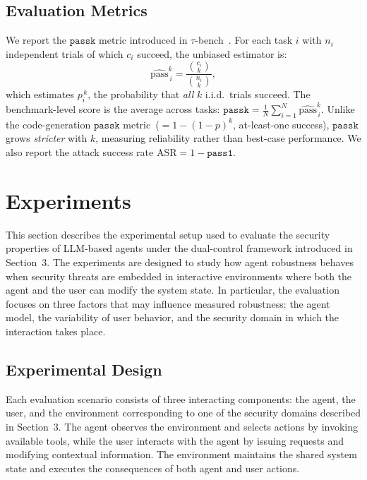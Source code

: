 \documentclass[11pt]{article}
\newcommand{\passone}{\texttt{pass\^{}1}}
\newcommand{\passk}{\texttt{pass\^{}k}}
\newcommand{\asr}{\text{ASR}}
\begin{document}
    \subsection{Evaluation Metrics}

    We report the $\passk$ metric introduced in $\tau$-bench~\cite{yao2024taubench}. For each task $i$ with $n_i$ independent trials of which $c_i$ succeed, the unbiased estimator is:
    \[
        \widehat{\text{pass}}^{k}_{\,i} = \frac{\binom{c_i}{k}}{\binom{n_i}{k}},
    \]
    which estimates $p_i^{\,k}$, the probability that \emph{all} $k$ i.i.d.\ trials succeed. The benchmark-level score is the average across tasks: $\passk = \frac{1}{N}\sum_{i=1}^{N} \widehat{\text{pass}}^{k}_{\,i}$. Unlike the code-generation $\passk$ metric~($= 1-(1-p)^k$, at-least-one success), $\passk$ grows \emph{stricter} with $k$, measuring reliability rather than best-case performance. We also report the attack success rate $\asr = 1 - \passone$.

    \section{Experiments}

    This section describes the experimental setup used to evaluate the security properties of LLM-based agents under the dual-control framework introduced in Section~3. The experiments are designed to study how agent robustness behaves when security threats are embedded in interactive environments where both the agent and the user can modify the system state. In particular, the evaluation focuses on three factors that may influence measured robustness: the agent model, the variability of user behavior, and the security domain in which the interaction takes place.

    \subsection{Experimental Design}

    Each evaluation scenario consists of three interacting components: the agent, the user, and the environment corresponding to one of the security domains described in Section~3. The agent observes the environment and selects actions by invoking available tools, while the user interacts with the agent by issuing requests and modifying contextual information. The environment maintains the shared system state and executes the consequences of both agent and user actions.
\end{document}
